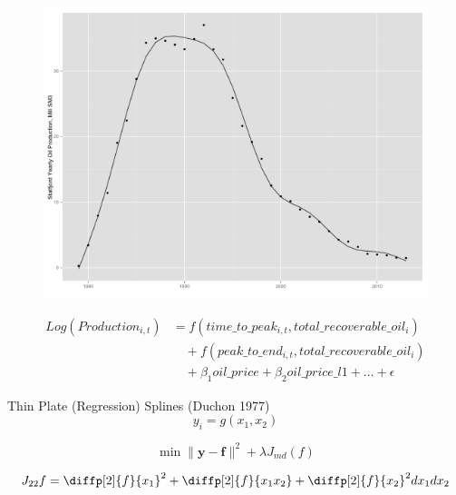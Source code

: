 \documentclass{beamer}
\begin{document}
\begin{frame}[plain]
	\begin{figure}
		\includegraphics[width=.8\textwidth]{figures/statfjord_gam.png}
		
		\label{statfjord_gam}
	\end{figure}
\end{frame}


\begin{frame}[plain]
	\begin{equation}
	\begin{split}
		Log(Production_{i,t})&=f(time\_to\_peak_{i,t}, total\_recoverable\_oil_i) \\
		& \quad + f(peak\_to\_end_{i,t}, total\_recoverable\_oil_i) \\
		& \quad + \beta_1 oil\_price + \beta_2 oil\_price\_l1 + ... +  \epsilon
	\end{split}
	\label{gam_price_eqn}
	\end{equation}
\end{frame}



\begin{frame}[plain]
	Thin Plate (Regression) Splines (Duchon 1977)
	\begin{equation}
	y_i = g(x_1, x_2)
	\end{equation}

	\begin{equation}
	\min \|\boldsymbol{y-f}\|^2 + \lambda J_{md}(f)
	\end{equation}

	\begin{equation}
	J_{22}{f}= \diffp[2]{f}{x_1}^2 + \diffp[2]{f}{{x_1}{x_2}} + \diffp[2]{f}{x_2}^2dx_1 dx_2
	\end{equation}
\end{frame}
\end{document}
